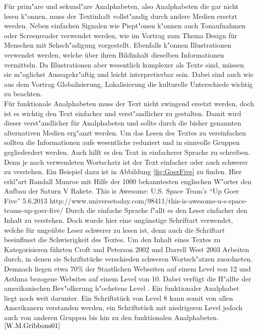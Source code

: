 Für prim"are und sekund"are Analphabeten, also Analphabeten die gar nicht lesen k"onnen, muss der Textinhalt vollst"andig durch andere Medien ersetzt werden. Neben einfachen Signalen wie Piept"onen k"onnen auch Tonaufnahmen oder Screenreader verwendet werden, wie im Vortrag zum Thema  \glqq Design für Menschen mit Sehsch"adigung \grqq vorgestellt.
Ebenfalls k"onnen Illustrationen verwendet werden, welche über ihren Bildinhalt dieselben Informationen vermitteln.
Da Illustrationen aber wesentlich komplexer als Texte sind, müssen sie m"oglichst Aussagekr"aftig und leicht interpretierbar sein. Dabei sind auch wie aus dem Vortrag \glqq Globalisierung, Lokalisierung \grqq die kulturelle Unterschiede wichtig zu beachten.\\
Für funktionale Analphabeten muss der Text nicht zwingend ersetzt werden, doch ist es wichtig den Text einfacher und verst"andlicher zu gestalten. Damit wird dieser verst"andlicher für Analphabeten und sollte durch die bisher genannten alternativen Medien erg"anzt werden. Um das Lesen des Textes zu vereinfachen sollten die Informationen aufs wesentliche reduziert und in sinnvolle Gruppen gegliederdert werden. Auch hilft es den Text in einfacherer Sprache zu schreiben. Denn je nach verwendeten Wortschatz ist der Text einfacher oder auch schwerer zu verstehen. Ein Beispiel dazu ist in Abbildung \ref{fig:GoerFive} zu finden. Hier erkl"art Randall Munroe mit Hilfe der 1000 bekanntesten englischen W"orter den Aufbau der Saturn V Rakete.
				{This is Awesome: U.S. Space Team’s “Up Goer Five”}
				{5.6.2013}
				{http://www.universetoday.com/98411/this-is-awesome-u-s-space-teams-up-goer-five/}
 Durch die einfache Sprache f"allt es den Leser einfacher den Inhalt zu verstehen. Doch wurde hier eine ungünstige Schriftart verwendet, welche für ungeübte Leser schwerer zu lesen ist, denn auch die Schriftart beeinflusst die Schwierigkeit des Textes.
Um den Inhalt eines Textes zu Kategorisieren führten Croft und Peterson 2002 und Darrell West 2003 Arbeiten durch, in denen sie Schriftstücke verschieden schweren Wortsch"atzen zuordneten.
Demnach liegen etwa 70\% der Staatlichen Webseiten auf einem Level von 12 und Asthma bezogene Websites auf einem Level von 10.
Dabei verfügt die H"alfte der amerikanischen Bev"olkerung h"ochstens Level . Ein funktionaler Analphabet liegt noch weit darunter.
Ein Schriftstück von Level 8 kann somit von allen Amerikanern verstanden werden, ein Schriftstück mit niedrigeren Level jedoch auch von anderen Gruppen bis hin zu den funktionalen Analphabeten.$^{\ref{W.M.Gribbons01}}$\\

